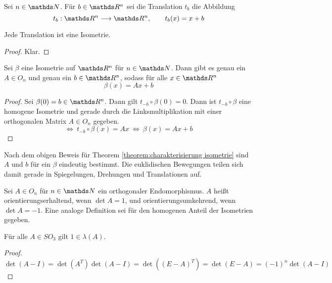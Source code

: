 		\begin{definition}[Translation]
			Sei $n\in\SN$. 
			Für $b\in\SR^n$ sei die Translation $t_b$ die Abbildung
			\[
				t_b:\SR^n\longrightarrow\SR^n,\qquad t_b(x) = x+b
			\]
		\end{definition}

		\begin{lemma}
			Jede Translation ist eine Isometrie.
		\end{lemma}
		\begin{proof}
			Klar.
		\end{proof}

		\begin{theorem}
		\label{theorem:charakterisierung isometrie}
			Sei $\beta$ eine Isometrie auf $\SR^n$ für $n\in\SN$.
			Dann gibt es genau ein $A\in O_n$ und genau ein $b\in\SR^n$, sodass für alle $x\in\SR^n$
			\[
				\beta(x) = Ax + b
			\]
		\end{theorem}
		\begin{proof}
			Sei $\beta(0)=b\in\SR^n$. 
			Dann gilt $t_{-b}\circ \beta(0) = 0$.
			Dann ist $t_{-b}\circ \beta$ eine homogene Isometrie und gerade durch die Linksmultiplikation mit einer orthogonalen Matrix $A\in O_n$ gegeben.
			\[
				\Leftrightarrow \ t_{-b}\circ \beta(x)=Ax \ \Leftrightarrow \ \beta(x) = Ax + b
			\]
		\end{proof}

		Nach dem obigen Beweis für Theorem \ref{theorem:charakterisierung isometrie} sind $A$ und $b$ für ein $\beta$ eindeutig bestimmt.
		Die euklidischen Bewegungen teilen sich damit gerade in Spiegelungen, Drehungen und Translationen auf.

		\begin{definition}[Orientierung]
			Sei $A\in O_n$ für $n\in\SN$ ein orthogonaler Endomorphismus.
			$A$ heißt orientierungserhaltend, wenn $\det A = 1$, und orientierungsumkehrend, wenn $\det A = -1$.
			Eine analoge Definition sei für den homogenen Anteil der Isometrien gegeben.
		\end{definition}

		\begin{lemma}
			Für alle $A\in SO_3$ gilt $1\in\lambda(A)$.
		\end{lemma}
		\begin{proof}
			\[
				\det (A-I) = \det(A^T)\det(A-I) = \det((E-A)^T) = \det(E-A) = (-1)^n \det(A-I)
			\]
		\end{proof}

